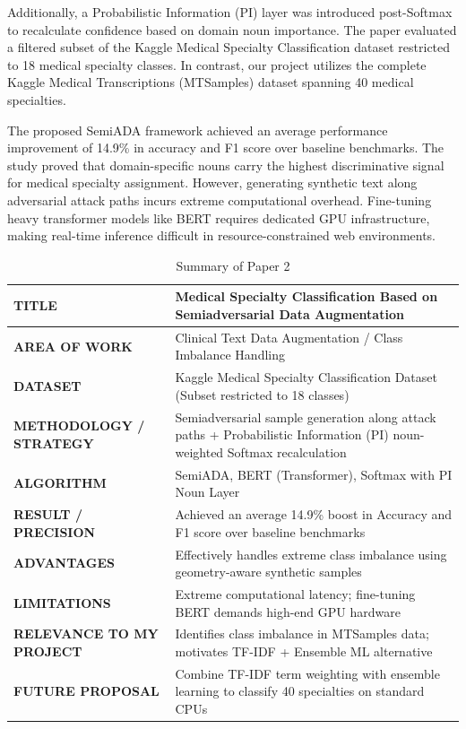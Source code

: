 Additionally, a Probabilistic Information (PI) layer was introduced post-Softmax to recalculate confidence based on domain noun importance. The paper evaluated a filtered subset of the Kaggle Medical Specialty Classification dataset restricted to 18 medical specialty classes. In contrast, our project utilizes the complete Kaggle Medical Transcriptions (MTSamples) dataset spanning 40 medical specialties.

The proposed SemiADA framework achieved an average performance improvement of 14.9\% in accuracy and F1 score over baseline benchmarks. The study proved that domain-specific nouns carry the highest discriminative signal for medical specialty assignment. However, generating synthetic text along adversarial attack paths incurs extreme computational overhead. Fine-tuning heavy transformer models like BERT requires dedicated GPU infrastructure, making real-time inference difficult in resource-constrained web environments.

\begin{table}[H]
\centering
\small
\setlength{\tabcolsep}{5pt}
\begin{tabularx}{\linewidth}{|>{\raggedright\arraybackslash}p{3.8cm}|>{\raggedright\arraybackslash}X|}
\hline
\textbf{TITLE} & Medical Specialty Classification Based on Semiadversarial Data Augmentation \cite{zhang2023} \\
\hline
\textbf{AREA OF WORK} & Clinical Text Data Augmentation / Class Imbalance Handling \\
\hline
\textbf{DATASET} & Kaggle Medical Specialty Classification Dataset (Subset restricted to 18 classes) \\
\hline
\textbf{METHODOLOGY / STRATEGY} & Semiadversarial sample generation along attack paths + Probabilistic Information (PI) noun-weighted Softmax recalculation \\
\hline
\textbf{ALGORITHM} & SemiADA, BERT (Transformer), Softmax with PI Noun Layer \\
\hline
\textbf{RESULT / PRECISION} & Achieved an average 14.9\% boost in Accuracy and F1 score over baseline benchmarks \\
\hline
\textbf{ADVANTAGES} & Effectively handles extreme class imbalance using geometry-aware synthetic samples \\
\hline
\textbf{LIMITATIONS} & Extreme computational latency; fine-tuning BERT demands high-end GPU hardware \\
\hline
\textbf{RELEVANCE TO MY PROJECT} & Identifies class imbalance in MTSamples data; motivates TF-IDF + Ensemble ML alternative \\
\hline
\textbf{FUTURE PROPOSAL} & Combine TF-IDF term weighting with ensemble learning to classify 40 specialties on standard CPUs \\
\hline
\end{tabularx}
\caption{Summary of Paper 2}
\label{tab:summary_paper2}
\end{table}

